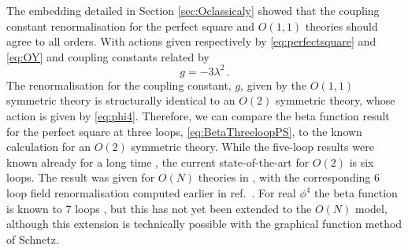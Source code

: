 \documentclass[a4paper,11pt]{article}
\begin{document}
The embedding detailed in Section \ref{sec:Oclassicaly} showed that the coupling constant renormalisation for the perfect square and $O(1,1)$ theories should agree to all orders. With actions given respectively by \cref{eq:perfectsquare} and \cref{eq:OY} and coupling constants related by 
\begin{equation}\label{eq:gPhi4PSequiv}
    g=-3 \lambda^2\,.
\end{equation}
The renormalisation for the coupling constant, $g$, given by the $O(1,1)$ symmetric theory is structurally identical to an $O(2)$ symmetric theory, whose action is given by \cref{eq:phi4}. Therefore, we can compare the beta function result for the perfect square at three loops, \cref{eq:BetaThreeloopPS}, to the known calculation for an $O(2)$ symmetric theory. While the five-loop results were known already for a long time  \cite{Chetyrkin:1981jq,Gorishnii:1983gp,Kazakov:1983dyk},   
the current state-of-the-art for $O(2)$ is six loops. The result was given for $O(N)$ theories in \cite{Kompaniets:2017yct}, with the corresponding 6 loop field renormalisation computed earlier in ref.~\cite{Batkovich:2016jus}. For real $\phi^4$ the beta function is known to 7 loops \cite{Schnetz:2022nsc,Schnetz:2016fhy}, but this has not yet been extended to the $O(N)$ model, although this extension is technically possible with the graphical function method of Schnetz.
\end{document}
